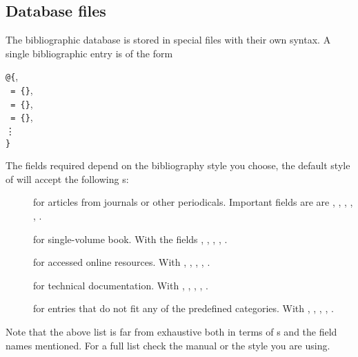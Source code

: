 \subsection{Database files}
The bibliographic database is stored in special  files with their own
syntax. A single bibliographic entry is of the form
\begin{lscommand}
  \texttt{@}\texttt{\{},\\
  \hspace*{1em}\texttt{ = \{}\texttt{\}},\\
  \hspace*{1em}\texttt{ = \{}\texttt{\}},\\
  \hspace*{1em}\texttt{ = \{}\texttt{\}},\\
  \hspace*{3em}\vdots\\
  \texttt{\}}
\end{lscommand}
The fields required depend on the bibliography style you choose,
the default style of  will accept
the following s:
\begin{description}
  \item[] for articles from journals or other periodicals. Important fields are
    are , , ,
    , , .
  \item[] for single-volume book. With the fields
    , , , ,
    .
  \item[] for accessed online resources. With
    , , , , .
  \item[] for technical documentation. With
    , , , , .
  \item[] for entries that do not fit any of the predefined
    categories. With , ,
    , , .
\end{description}
Note that the above list is far from exhaustive both in terms of s and the field names mentioned. For a full list check the 
manual or the style you are using.

